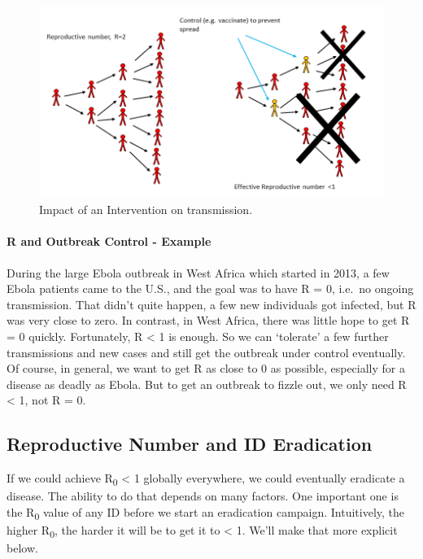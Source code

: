 \documentclass[]{article}
\let\oldparagraph\paragraph
\renewcommand{\paragraph}[1]{\oldparagraph{#1}\mbox{}}
\theoremstyle{definition}
\theoremstyle{definition}
\theoremstyle{definition}
\theoremstyle{remark}
\begin{document}
\begin{figure}
\centering
\includegraphics{./images/R0intervention.png}
\caption{Impact of an Intervention on transmission.}
\end{figure}

\paragraph{R and Outbreak Control - Example}\label{myexamplebox}

During the large Ebola outbreak in West Africa which started in 2013, a
few Ebola patients came to the U.S., and the goal was to have R = 0,
i.e.~no ongoing transmission. That didn't quite happen, a few new
individuals got infected, but R was very close to zero. In contrast, in
West Africa, there was little hope to get R = 0 quickly. Fortunately, R
\textless{} 1 is enough. So we can `tolerate' a few further
transmissions and new cases and still get the outbreak under control
eventually. Of course, in general, we want to get R as close to 0 as
possible, especially for a disease as deadly as Ebola. But to get an
outbreak to fizzle out, we only need R \textless{} 1, not R = 0.

\subsection{Reproductive Number and ID
Eradication}\label{reproductive-number-and-id-eradication}

If we could achieve R\textsubscript{0} \textless{} 1 globally
everywhere, we could eventually eradicate a disease. The ability to do
that depends on many factors. One important one is the
R\textsubscript{0} value of any ID before we start an eradication
campaign. Intuitively, the higher R\textsubscript{0}, the harder it will
be to get it to \textless{} 1. We'll make that more explicit below.
\end{document}
